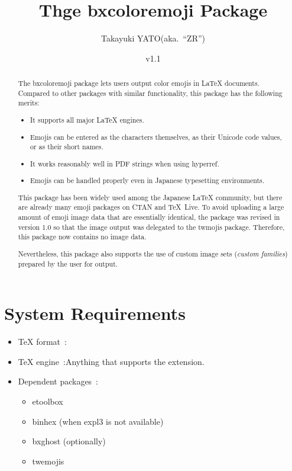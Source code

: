 \documentclass[a4paper]{article}
\newcommand{\PkgVersion}{1.1}
\newcommand{\PkgDate}{2026/06/22}
\newcommand{\Pkg}[1]{\textsf{#1}}
\newcommand{\Means}{~:\quad}
\newcommand{\／}{\mbox{}／\mbox{}}
\begin{document}
\title{Thge \Pkg{bxcoloremoji} Package}
\author{Takayuki YATO\quad (aka.~``ZR'')}
\date{v\PkgVersion \quad[\PkgDate]}
\maketitle

\begin{abstract}

The \Pkg{bxcoloremoji} package lets users output color emojis
in {\LaTeX} documents.
Compared to other packages with similar functionality,
this package has the following merits:
\begin{itemize}
\item It supports all major {\LaTeX} engines.
\item Emojis can be entered as the characters themselves,
  as their Unicode code values, or as their short names.
\item It works reasonably well in PDF strings when using \Pkg{hyperref}.
\item Emojis can be handled properly even
  in Japanese typesetting environments.
\end{itemize}

This package has been widely used among the Japanese {\LaTeX} community,
but there are already many emoji packages on CTAN and {\TeX}~Live.
To avoid uploading a large amount of emoji image data
that are essentially identical,
the package was revised in version 1.0
so that the image output was delegated to the \Pkg{twmojis} package.
Therefore, this package now contains no image data.

Nevertheless, this package also supports
the use of custom image sets (\emph{custom families})
prepared by the user for output.
\end{abstract}

\tableofcontents


\section{System Requirements}
\label{sec:Prerequisites}

\begin{itemize}
\item {\TeX} format\Means {\LaTeX}
\item {\TeX} engine\Means Anything that supports the {\eTeX} extension.
\item Dependent packages\Means
  \begin{itemize}
  \item \Pkg{etoolbox}
  \item \Pkg{binhex} (when expl3 is not available)
  \item \Pkg{bxghost} (optionally)
  \item \Pkg{twemojis}
  \end{itemize}
\end{itemize}
\end{document}
